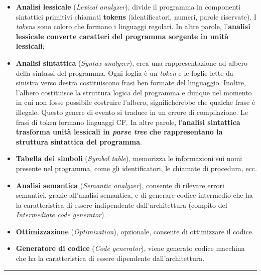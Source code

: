 \documentclass[a4paper]{article}
\newcommand{\longline}{\noindent\rule{\textwidth}{0.4pt}}
\begin{document}
	\begin{itemize}
		\item \textcolor{Red3}{\textbf{Analisi lessicale}} (\emph{Lexical analyzer}), divide il programma in componenti sintattici primitivi chiamati \textbf{tokens} (identificatori, numeri, parole riservate). I \emph{tokens} sono coloro che formano i linguaggi regolari.\newline
		In altre parole, l'\textbf{analisi lessicale converte caratteri del programma sorgente in unità lessicali};\newpage

		\item \textcolor{Red3}{\textbf{Analisi sintattica}} (\emph{Syntax analyzer}), crea una rappresentazione ad albero della sintassi del programma. Ogni foglia è un \emph{token} e le foglie lette da sinistra verso destra costituiscono frasi ben formate del linguaggio. Inoltre, l'albero costituisce la struttura logica del programma e dunque nel momento in cui non fosse possibile costruire l'albero, significherebbe che qualche frase è illegale. Questo genere di evento si traduce in un errore di compilazione. Le frasi di token formano linguaggi CF.\newline
		In altre parole, l'\textbf{analisi sintattica trasforma unità lessicali in \emph{parse tree} che rappresentano la struttura sintattica del programma}.

		\item \textcolor{Red3}{\textbf{Tabella dei simboli}} (\emph{Symbol table}), memorizza le informazioni sui nomi presente nel programma, come gli identificatori, le chiamate di procedura, ecc.
		
		\item \textcolor{Red3}{\textbf{Analisi semantica}} (\emph{Semantic analyzer}), consente di rilevare errori semantici, grazie all'analisi semantica, e di generare codice intermedio che ha la caratteristica di essere indipendente dall'architettura (compito del \emph{Intermediate code generator}).

		\item \textcolor{Red3}{\textbf{Ottimizzazione}} (\emph{Optimization}), opzionale, consente di ottimizzare il codice.

		\item \textcolor{Red3}{\textbf{Generatore di codice}} (\emph{Code generator}), viene generato codice macchina che ha la caratteristica di essere dipendente dall'architettura.
	\end{itemize}

	\longline
\end{document}
